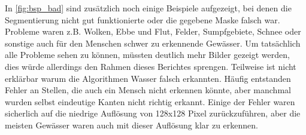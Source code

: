 In \autoref{fig:bsp_bad} sind zusätzlich noch einige Beispiele aufgezeigt, 
bei denen die Segmentierung nicht gut funktionierte 
oder die gegebene Maske falsch war.
Probleme waren z.B. Wolken, Ebbe und Flut, Felder, Sumpfgebiete, Schnee oder sonstige auch für den Menschen schwer zu erkennende Gewässer.
Um tatsächlich alle Probleme sehen zu können, müssten deutlich mehr Bilder gezeigt werden, dies würde allerdings den Rahmen dieses Berichtes sprengen.
Teilweise ist nicht erklärbar warum die Algorithmen Wasser falsch erkannten.
Häufig entstanden Fehler an Stellen, die auch ein Mensch nicht erkennen könnte, aber manchmal wurden selbst eindeutige Kanten nicht richtig erkannt.
Einige der Fehler waren sicherlich auf die niedrige Auflösung von 128x128 Pixel zurückzuführen, aber die meisten Gewässer waren auch mit dieser Auflösung klar zu erkennen.
